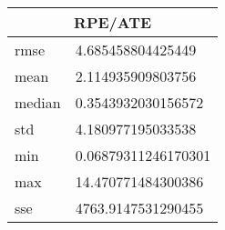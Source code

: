 \begin{table}[!ht] 
 \centering 
 \begin{tabular}{|l|l|} \hline 
 \multicolumn{2}{|c|}{RPE/ATE} \\ \hline 
 rmse & 4.685458804425449 \\ \hline 
mean & 2.114935909803756 \\ \hline 
median & 0.3543932030156572 \\ \hline 
std & 4.180977195033538 \\ \hline 
min & 0.06879311246170301 \\ \hline 
max & 14.470771484300386 \\ \hline 
sse & 4763.9147531290455 \\ \hline 
\end{tabular} 
 \end{table}